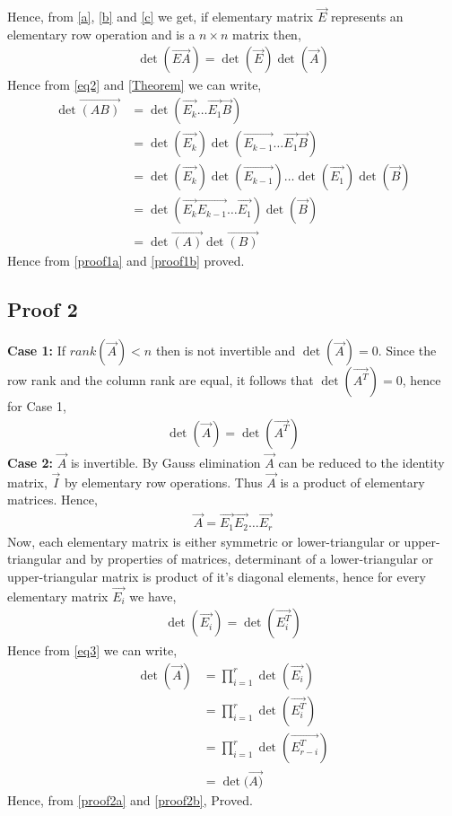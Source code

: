 \documentclass[journal,12pt,twocolumn]{IEEEtran}
\begin{document}
Hence, from \eqref{a}, \eqref{b} and \eqref{c} we get, if elementary matrix $\vec{E}$ represents an elementary row operation and  is a $n \times n$ matrix then,
\begin{align}
    \det(\vec{EA}) = \det(\vec{E})\det(\vec{A}) \label{Theorem}
\end{align}
Hence from \eqref{eq2} and \eqref{Theorem} we can write,
\begin{align}
\det\vec{(AB)} &= \det(\vec{E_{k}}\dots\vec{E_1}\vec{B})\\
&= \det(\vec{E_k})\det(\vec{E_{k-1}}\dots\vec{E_1}\vec{B})\\
&= \det(\vec{E_k})\det(\vec{E_{k-1}})\dots\det(\vec{E_1})\det(\vec{B})\\
&= \det(\vec{E_k}\vec{E_{k-1}}\dots\vec{E_1})\det(\vec{B})\\
&=\det\vec{(A)}\det\vec{(B)}\label{proof1b}
\end{align}
Hence from \eqref{proof1a} and \eqref{proof1b} proved.

\subsection{Proof 2}
\textbf{Case 1:} If $rank(\vec{A})<n$ then  is not invertible and $\det(\vec{A}) = 0$. Since the row rank and the
column rank are equal, it follows that $\det(\vec{A^T}) = 0$, hence for Case 1, 
\begin{align}
    \det(\vec{A}) = \det(\vec{A^T})\label{proof2a}
\end{align}
\textbf{Case 2:} $\vec{A}$ is invertible. By Gauss elimination $\vec{A}$ can be reduced to the identity matrix, $\vec{I}$ by elementary row operations. Thus $\vec{A}$ is a product of elementary matrices. Hence,
\begin{align}
\vec{A} = \vec{E_1}\vec{E_2}\dots\vec{E_r}\label{eq3}
\end{align}
Now, each elementary matrix is either symmetric or lower-triangular or upper-triangular and by properties of matrices, determinant of a lower-triangular or upper-triangular matrix is product of it's diagonal elements, hence for every elementary matrix $\vec{E_i}$ we have,
\begin{align}
\det(\vec{E_i}) = \det(\vec{E_i^T}) 
\end{align}
Hence from \eqref{eq3} we can write,
\begin{align}
\det(\vec{A}) &= \prod_{i=1}^{r} \det(\vec{E_i})\\
&= \prod_{i=1}^{r} \det(\vec{E_i^T})\\
&= \prod_{i=1}^{r} \det(\vec{E_{r-i}^T})\\
&= \det(\vec{A)}\label{proof2b}
\end{align}
Hence, from \eqref{proof2a} and \eqref{proof2b}, Proved.
\end{document}
